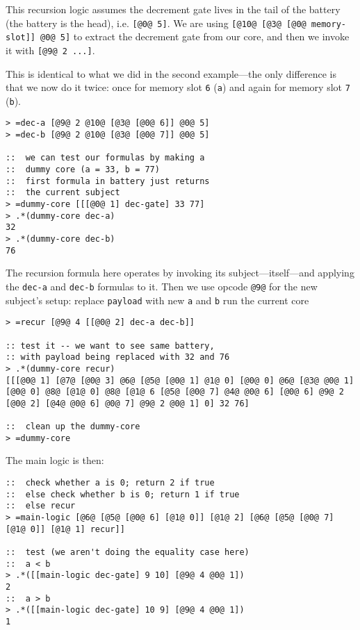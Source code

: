 \documentclass[twoside]{article}
\begin{document}
This recursion logic assumes the decrement gate lives in the tail of the battery (the battery is the head), i.e. \lstinline[style=inlinecode]{[@0@ 5]}. We are using \lstinline[style=inlinecode]{[@10@ [@3@ [@0@ memory-slot]] @0@ 5]} to extract the decrement gate from our core, and then we invoke it with \lstinline[style=inlinecode]{[@9@ 2 ...]}.

This is identical to what we did in the second example—the only difference is that we now do it twice: once for memory slot \lstinline[style=inlinecode]{6} (\lstinline[style=inlinecode]{a}) and again for memory slot \lstinline[style=inlinecode]{7} (\lstinline[style=inlinecode]{b}).

\begin{lstlisting}[style=listingblock]
> =dec-a [@9@ 2 @10@ [@3@ [@0@ 6]] @0@ 5]
> =dec-b [@9@ 2 @10@ [@3@ [@0@ 7]] @0@ 5]

::  we can test our formulas by making a
::  dummy core (a = 33, b = 77)
::  first formula in battery just returns
::  the current subject
> =dummy-core [[[@0@ 1] dec-gate] 33 77]
> .*(dummy-core dec-a)
32
> .*(dummy-core dec-b)
76
\end{lstlisting}

The recursion formula here operates by invoking its subject—itself—and applying the \lstinline[style=inlinecode]{dec-a} and \lstinline[style=inlinecode]{dec-b} formulas to it.  Then we use opcode \lstinline[style=inlinecode]{@9@} for the new subject's setup: replace \lstinline[style=inlinecode]{payload} with new \lstinline[style=inlinecode]{a} and \lstinline[style=inlinecode]{b} run the current core

\begin{lstlisting}[style=listingblock]
> =recur [@9@ 4 [[@0@ 2] dec-a dec-b]]

:: test it -- we want to see same battery,
:: with payload being replaced with 32 and 76
> .*(dummy-core recur)
[[[@0@ 1] [@7@ [@0@ 3] @6@ [@5@ [@0@ 1] @1@ 0] [@0@ 0] @6@ [@3@ @0@ 1] [@0@ 0] @8@ [@1@ 0] @8@ [@1@ 6 [@5@ [@0@ 7] @4@ @0@ 6] [@0@ 6] @9@ 2 [@0@ 2] [@4@ @0@ 6] @0@ 7] @9@ 2 @0@ 1] 0] 32 76]

::  clean up the dummy-core
> =dummy-core
\end{lstlisting}

The main logic is then:

\begin{lstlisting}[style=listingcode]
::  check whether a is 0; return 2 if true
::  else check whether b is 0; return 1 if true
::  else recur
> =main-logic [@6@ [@5@ [@0@ 6] [@1@ 0]] [@1@ 2] [@6@ [@5@ [@0@ 7] [@1@ 0]] [@1@ 1] recur]]

::  test (we aren't doing the equality case here)
::  a < b
> .*([[main-logic dec-gate] 9 10] [@9@ 4 @0@ 1])
2
::  a > b
> .*([[main-logic dec-gate] 10 9] [@9@ 4 @0@ 1])
1
\end{lstlisting}
\end{document}
